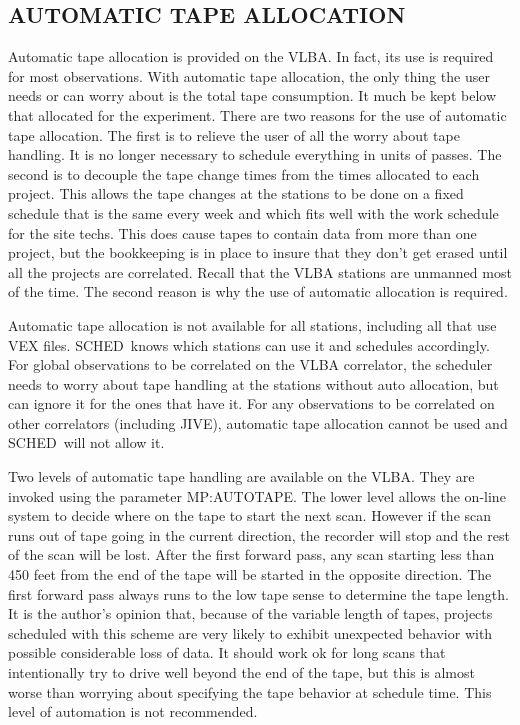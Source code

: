 \documentclass{report}
\newcommand{\schedb}{{\sc SCHED~}}
\begin{document}
\subsection{\label{SSSEC:AUTOTAPE}AUTOMATIC TAPE ALLOCATION}

Automatic tape allocation is provided on the VLBA.  In fact, its
use is required for most observations.  With automatic tape
allocation, the only thing the user needs or can worry about is the
total tape consumption.  It much be kept below that allocated for the
experiment.  There are two reasons for the use of automatic tape
allocation.  The first is to relieve the user of all the worry about
tape handling.  It is no longer necessary to schedule everything in
units of passes.  The second is to decouple the tape change times from
the times allocated to each project.  This allows the tape changes at
the stations to be done on a fixed schedule that is the same every
week and which fits well with the work schedule for the site techs.
This does cause tapes to contain data from more than one project, but
the bookkeeping is in place to insure that they don't get erased until
all the projects are correlated.  Recall that the VLBA stations are
unmanned most of the time.  The second reason is why the use of
automatic allocation is required.

Automatic tape allocation is not available for all stations, including
all that use VEX files.  \schedb knows which stations can use it and
schedules accordingly.  For global observations to be correlated on
the VLBA correlator, the scheduler needs to worry about tape handling
at the stations without auto allocation, but can ignore it for the
ones that have it.  For any observations to be correlated on other
correlators (including JIVE), automatic tape allocation cannot be used
and \schedb will not allow it.

Two levels of automatic tape handling are available on the VLBA.  They
are invoked using the parameter 
{MP:AUTOTAPE}.  The lower level allows the on-line system to decide
where on the tape to start the next scan.  However if the scan runs
out of tape going in the current direction, the recorder will stop and
the rest of the scan will be lost.  After the first forward pass, any
scan starting less than 450 feet from the end of the tape will be
started in the opposite direction.  The first forward pass always runs
to the low tape sense to determine the tape length.  It is the
author's opinion that, because of the variable length of tapes,
projects scheduled with this scheme are very likely to exhibit
unexpected behavior with possible considerable loss of data.  It
should work ok for long scans that intentionally try to drive well
beyond the end of the tape, but this is almost worse than worrying
about specifying the tape behavior at schedule time.  This level of
automation is not recommended.
\end{document}
